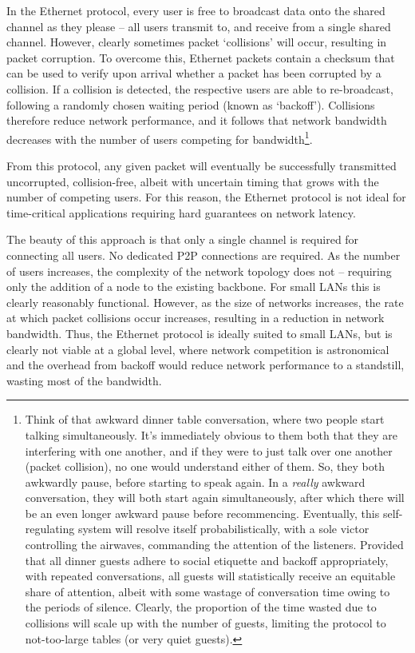 \documentclass[aps, rmp, twocolumn, amsmath, amssymb, nofootinbib, superscriptaddress, longbibliography, floatfix, table-of-contents, eqsecnum]{revtex4-1}
\begin{document}
In the Ethernet protocol, every user is free to broadcast data onto the shared channel as they please -- all users transmit to, and receive from a single shared channel. However, clearly sometimes packet `collisions' will occur, resulting in packet corruption. To overcome this, Ethernet packets contain a checksum that can be used to verify upon arrival whether a packet has been corrupted by a collision. If a collision is detected, the respective users are able to re-broadcast, following a randomly chosen waiting period (known as `backoff'). Collisions therefore reduce network performance, and it follows that network bandwidth decreases with the number of users competing for bandwidth\footnote{Think of that awkward dinner table conversation, where two people start talking simultaneously. It's immediately obvious to them both that they are interfering with one another, and if they were to just talk over one another (packet collision), no one would understand either of them. So, they both awkwardly pause, before starting to speak again. In a \textit{really} awkward conversation, they will both start again simultaneously, after which there will be an even longer awkward pause before recommencing. Eventually, this self-regulating system will resolve itself probabilistically, with a sole victor controlling the airwaves, commanding the attention of the listeners. Provided that all dinner guests adhere to social etiquette and backoff appropriately, with repeated conversations, all guests will statistically receive an equitable share of attention, albeit with some wastage of conversation time owing to the periods of silence. Clearly, the proportion of the time wasted due to collisions will scale up with the number of guests, limiting the protocol to not-too-large tables (or very quiet guests).}.

From this protocol, any given packet will eventually be successfully transmitted uncorrupted, collision-free, albeit with uncertain timing that grows with the number of competing users. For this reason, the Ethernet protocol is not ideal for time-critical applications requiring hard guarantees on network latency.

The beauty of this approach is that only a single channel is required for connecting all users. No dedicated P2P connections are required. As the number of users increases, the complexity of the network topology does not -- requiring only the addition of a node to the existing backbone. For small LANs this is clearly reasonably functional. However, as the size of networks increases, the rate at which packet collisions occur increases, resulting in a reduction in network bandwidth. Thus, the Ethernet protocol is ideally suited to small LANs, but is clearly not viable at a global level, where network competition is astronomical and the overhead from backoff would reduce network performance to a standstill, wasting most of the bandwidth.
\end{document}
